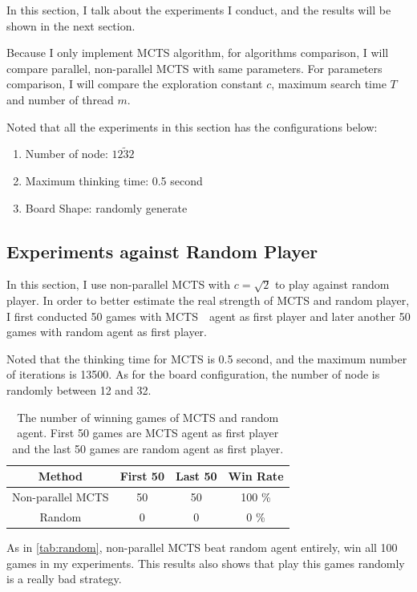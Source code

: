 \documentclass[twocolumn]{extarticle}
\begin{document}
In this section, I talk about the experiments I conduct, and the results will be shown in the next section.

Because I only implement MCTS algorithm, for algorithms comparison, I will compare parallel, non-parallel MCTS with same parameters. For parameters comparison, I will compare the exploration constant $c$, maximum search time $T$ and number of thread $m$.

Noted that all the experiments in this section has the configurations below:

\begin{enumerate}
\item Number of node: $12 \tilde 32$
\item Maximum thinking time: 0.5 second
\item Board Shape: randomly generate
\end{enumerate}

\subsection{Experiments against Random Player}

In this section, I use non-parallel MCTS with $c=\sqrt{2}$ to play against random player. In order to better estimate the real strength of MCTS and random player, I first conducted 50 games with MCTS　agent as first player and later another 50 games with random agent as first player.

Noted that the thinking time for MCTS is 0.5 second, and the maximum number of iterations is 13500. As for the board configuration, the number of node is randomly between 12 and 32.

\begin{table}[H]
\centering
\caption{The number of winning games of MCTS and random agent. First 50 games are MCTS agent as first player and the last 50 games are random agent as first player.}
\label{tab:random}
\begin{tabular}{@{}cccc@{}}
\toprule
\textbf{Method}   & \textbf{First 50} & \textbf{Last 50} & \textbf{Win Rate} \\ \midrule
Non-parallel MCTS & 50                & 50               & 100 \%\\
Random            & 0                 & 0                & 0 \% \\ \bottomrule
\end{tabular}
\end{table}

As in \autoref{tab:random}, non-parallel MCTS beat random agent entirely, win all 100 games in my experiments. This results also shows that play this games randomly is a really bad strategy.
\end{document}
